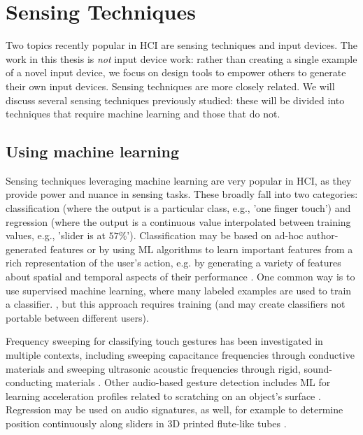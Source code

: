 \section{Sensing Techniques}
    
    Two topics recently popular in HCI are sensing techniques and input devices. The work in this thesis is \emph{not} input device work: rather than creating a single example of a novel input device, we focus on design tools to empower others to generate their own input devices. Sensing techniques are more closely related. We will discuss several sensing techniques previously studied: these will be divided into techniques that require machine learning and those that do not.

    \subsection{Using machine learning}
    Sensing techniques leveraging machine learning are very popular in HCI, as they provide power and nuance in sensing tasks. These broadly fall into two categories: classification (where the output is a particular class, e.g., 'one finger touch') and regression (where the output is a continuous value interpolated between training values, e.g., 'slider is at $57\%$'). Classification may be based on ad-hoc author-generated features \cite{hudson-whack} or by using ML algorithms to learn important features from a rich representation of the user’s action, e.g. by generating a variety of features about spatial and temporal aspects of their performance \cite{harrison-scratchinput,harrison-skinput,murray-smith-stane}. One common way is to use supervised machine learning, where many labeled examples are used to train a classifier. \cite{sato-touche,ono-touchandactivate,laput-acoustruments}, but this approach requires training (and may create classifiers not portable between different users).
    
    Frequency sweeping for classifying touch gestures has been investigated in multiple contexts, including sweeping capacitance frequencies through conductive materials \cite{sato-touche} and sweeping ultrasonic acoustic frequencies through rigid, sound-conducting materials \cite{ono-touchandactivate}. Other audio-based gesture detection includes ML for learning acceleration profiles related to scratching on an object's surface \cite{harrison-scratchinput,murray-smith-stane}. Regression may be used on audio signatures, as well, for example to determine position continuously along sliders in 3D printed flute-like tubes \cite{laput-acoustruments} .
    

